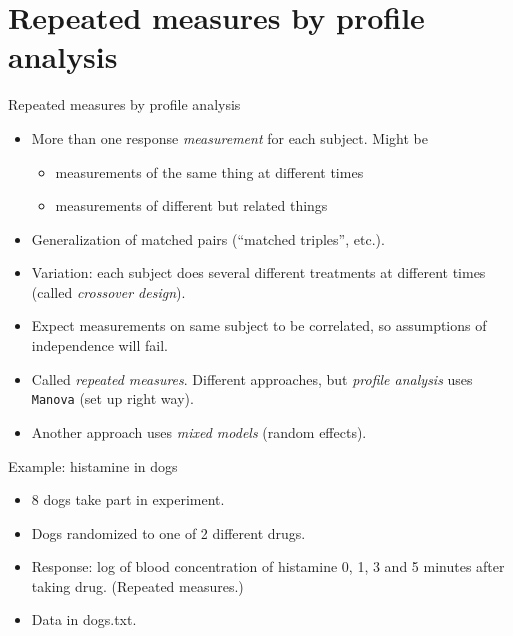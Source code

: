 \section{Repeated measures by profile analysis}
\frame{\sectionpage}

\begin{frame}[fragile]{Repeated measures by profile analysis}

  \begin{itemize}
  \item More than one response {\em measurement} for each subject. Might be
    \begin{itemize}
    \item measurements of the same thing at different times
    \item measurements of different but related things
    \end{itemize}
  \item Generalization of matched pairs (``matched triples'', etc.).
  \item Variation: each subject does several different treatments at different times (called {\em crossover design}).
  \item Expect measurements on same subject to be correlated, so
    assumptions of independence will fail.
  \item Called {\em repeated measures}. Different approaches, but {\em
      profile analysis} uses \texttt{Manova} (set up right way).
  \item Another approach uses \emph{mixed models} (random effects).
  \end{itemize}
\end{frame}




\begin{frame}[fragile]{Example: histamine in dogs}
  
  \begin{itemize}
  \item 8 dogs take part in experiment.
  \item Dogs randomized to one of 2 different drugs.
  \item Response: log of blood concentration of histamine 0, 1, 3 and 5 minutes after taking drug. (Repeated measures.)
  \item Data in dogs.txt.
  \end{itemize}

\end{frame}

